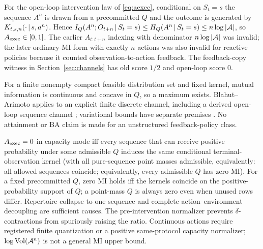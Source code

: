 \begin{proposition}\label{prop:wd-exec}
For the open-loop intervention law of \eqref{eq:aexec}, conditional on
$S_t=s$ the sequence $A^n$ is drawn from a precommitted $Q$ and the outcome is
generated by $K_{t,s,n}(\cdot\,|\, s,a^n)$. Hence
$I_Q(A^n;O_{t+n}\,|\, S_t=s)\le H_Q(A^n\,|\, S_t=s)\le n\log|\mathcal{A}|$,
so $A_{\mathrm{exec}}\in[0,1]$. The earlier $A_{t:t+n}$ indexing with denominator
$n\log|\mathcal{A}|$ was invalid; the later ordinary-MI form with exactly $n$
actions was also invalid for reactive policies because it counted
observation-to-action feedback. The feedback-copy witness in
Section~\ref{sec:channels} has old score $1/2$ and open-loop score $0$.

For a finite nonempty compact feasible distribution set and fixed kernel,
mutual information is continuous and concave in $Q$, so a maximum exists.
Blahut--Arimoto applies to an explicit finite discrete channel, including a
derived open-loop sequence channel \citep{cover_thomas2006}; variational bounds
have separate premises \citep{mohamed2015}. No attainment or BA claim is made
for an unstructured feedback-policy class.

$A_{\mathrm{exec}}=0$ in capacity mode iff every sequence that can receive positive
probability under some admissible $Q$ induces the same conditional
terminal-observation kernel (with all pure-sequence point masses admissible,
equivalently: all allowed sequences coincide; equivalently, every admissible
$Q$ has zero MI). For a fixed precommitted $Q$, zero MI holds iff the kernels
coincide on the positive-probability support of $Q$; a point-mass $Q$ is
always zero even when unused rows differ. Repertoire collapse to one sequence
and complete action--environment decoupling are sufficient causes. The
pre-intervention normalizer prevents
$\delta$-contractions from spuriously raising the ratio. Continuous actions
require registered finite quantization or a positive same-protocol capacity
normalizer; $\log\mathrm{Vol}(\mathcal{A}^n)$ is not a general MI upper bound.
\end{proposition}


